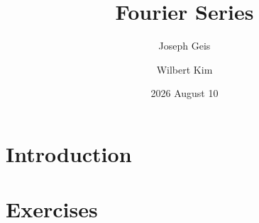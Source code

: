 \documentclass[11pt, oneside]{amsart}   	%
\title{Fourier Series}
\author{Joseph Geis}
\author{Wilbert Kim}
\date{2026 August 10}
\theoremstyle{definition}
\numberwithin{equation}{problem}
\begin{document}
\maketitle

\section{Introduction}



\section{Exercises}














\end{document}
